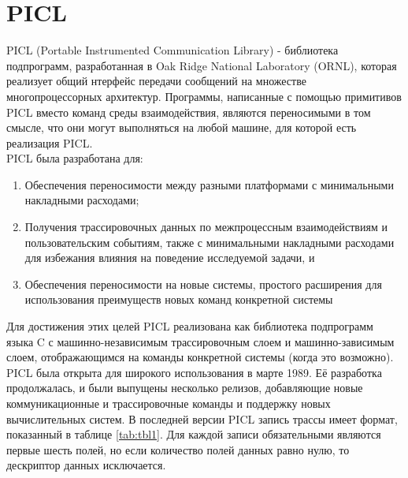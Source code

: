 \section{PICL}
PICL (Portable Instrumented Communication Library)  - библиотека подпрограмм, разработанная в Oak Ridge National Laboratory (ORNL), которая реализует общий
нтерфейс передачи сообщений на множестве многопроцессорных архитектур. Программы, написанные с помощью примитивов PICL вместо команд среды взаимодействия, являются переносимыми в том смысле, что они могут выполняться на любой машине, для которой есть реализация PICL.\\
PICL была разработана для:
\begin{enumerate} 
	\item Обеспечения переносимости между разными платформами с минимальными накладными расходами;
	\item Получения трассировочных данных по межпроцессным взаимодействиям и пользовательским событиям, также с минимальными накладными расходами для избежания влияния на поведение исследуемой задачи, и
	\item Обеспечения переносимости на новые системы, простого расширения для использования преимуществ новых команд конкретной системы
\end{enumerate} 
Для достижения этих целей PICL реализована как библиотека подпрограмм языка C с машинно-независимым трассировочным слоем и машинно-зависимым слоем, отображающимся на команды конкретной системы (когда это возможно). PICL  была открыта для широкого использования в марте 1989. Её разработка продолжалась, и были выпущены несколько релизов, добавляющие новые коммуникационные и трассировочные команды и поддержку новых вычислительных систем.
В последней версии PICL запись трассы имеет формат, показанный в таблице \ref{tab:tbl1}. Для каждой записи обязательными являются первые шесть полей, но если количество полей данных равно нулю, то дескриптор данных исключается.

